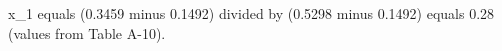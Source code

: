 x_1 equals (0.3459 minus 0.1492) divided by (0.5298 minus 0.1492) equals 0.28 (values from Table A-10).